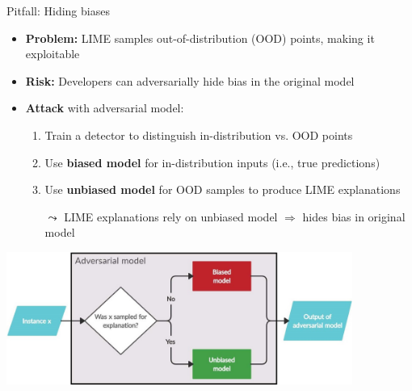 \documentclass[11pt,compress,t,notes=noshow, aspectratio=169, xcolor=table]{beamer}
\begin{document}
\begin{frame}{Pitfall: Hiding biases }

\begin{itemize}
      \item \textbf{Problem:} LIME samples out-of-distribution (OOD) points, making it exploitable
  \item \textbf{Risk:} Developers can adversarially hide bias in the original model
	\pause
	\item \textbf{Attack} with adversarial model:
	    \begin{enumerate}
	    \item Train a detector to distinguish in-distribution vs. OOD points
        \item Use \textbf{biased model} for in-distribution inputs (i.e., true predictions)
        \item Use \textbf{unbiased model} for OOD samples to produce LIME explanations
        \item[$\leadsto$] LIME explanations rely on unbiased model $\Rightarrow$ hides bias in original model 
	    \end{enumerate}
\end{itemize}
	    \centering
	    \includegraphics[width=0.85\textwidth]{figure/attack_biased_unbiased.jpg}\\

\end{frame}
\end{document}

